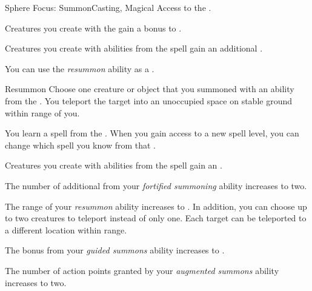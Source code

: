     \begin{feat}{Sphere Focus: Summon}{Casting, Magical}
        \featpre Access to the  .

         Creatures you create with the   gain a  bonus to .

         Creatures you create with abilities from the  spell gain an additional .

         You can use the \textit{resummon} ability as a .
        \begin{freeability}{Resummon}
            Choose one creature or object that you summoned with an ability from the  .
            You teleport the target into an unoccupied space on stable ground within \rngmed range of you.
        \end{freeability}

         You learn a spell from the  .
        When you gain access to a new spell level, you can change which spell you know from that .

         Creatures you create with abilities from the  spell gain an .

         The number of additional  from your \textit{fortified summoning} ability increases to two.

         The range of your \textit{resummon} ability increases to \rnglong.
        In addition, you can choose up to two creatures to teleport instead of only one.
        Each target can be teleported to a different location within range.

         The bonus from your \textit{guided summons} ability increases to .

         The number of action points granted by your \textit{augmented summons} ability increases to two.
    \end{feat}

